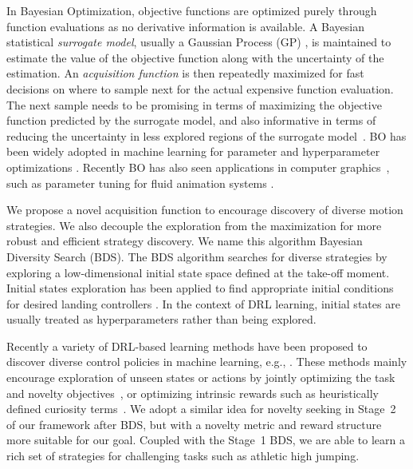 In Bayesian Optimization, objective functions are optimized purely through function evaluations as no derivative information is available. A Bayesian statistical \textit{surrogate model}, usually a Gaussian Process (GP) \cite{rasmussen2003gaussian-process}, is maintained to estimate the value of the objective function along with the uncertainty of the estimation. An \textit{acquisition function} is then repeatedly maximized for fast decisions on where to sample next for the actual expensive function evaluation. The next sample needs to be promising in terms of maximizing the objective function predicted by the surrogate model, and also informative in terms of reducing the uncertainty in less explored regions of the surrogate model~\cite{jones1998-bo-expected-improvement, frazier2009-bo-knowledge-gradient, GP-bandit}. BO has been widely adopted in machine learning for parameter and hyperparameter optimizations \cite{snoek2015scalable,klein2017fast,kandasamy2018neural,kandasamy2020tuning,korovina2020chembo,snoek2012practical}. Recently BO has also seen applications in computer graphics~\cite{koyama2017sequential,koyama2020sequential}, such as parameter tuning for fluid animation systems \cite{brochu2007preference}. 

We propose a novel acquisition function to encourage discovery of diverse motion strategies. We also decouple the exploration from the maximization for more robust and efficient strategy discovery. We name this algorithm Bayesian Diversity Search (BDS). The BDS algorithm searches for diverse strategies by exploring a low-dimensional initial state space defined at the take-off moment. Initial states exploration has been applied to find appropriate initial conditions for desired landing controllers \cite{ha2012falling}. In the context of DRL learning, initial states are usually treated as hyperparameters rather than being explored.

Recently a variety of DRL-based learning methods have been proposed to discover diverse control policies in machine learning, e.g.,  \cite{Eysenbach19,zhang2019novel-policies,Sun2020novel-policies,achiam2018variational,sharma2019dynamics,haarnoja2018soft,conti2018improving,houthooft2016vime,hester2017intrinsically,schmidhuber1991curious}. These methods mainly encourage exploration of unseen states or actions by jointly optimizing the task and novelty objectives~\cite{zhang2019novel-policies}, or optimizing intrinsic rewards such as heuristically defined curiosity terms~\cite{Eysenbach19,sharma2019dynamics}. We adopt a similar idea for novelty seeking in Stage~2 of our framework after BDS, but with a novelty metric and reward structure more suitable for our goal. Coupled with the Stage~1 BDS, we are able to learn a rich set of strategies for challenging tasks such as athletic high jumping.

